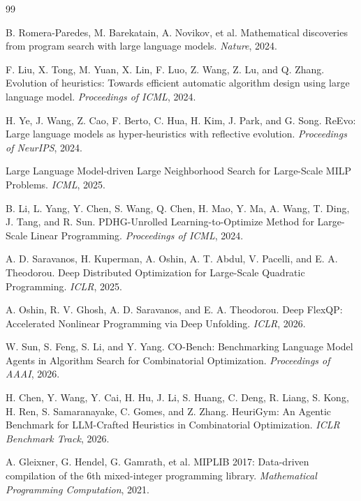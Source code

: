 \documentclass[UTF8,a4paper,12pt,fontset=fandol]{ctexart}
\begin{document}
\newpage
\begin{thebibliography}{99}

B. Romera-Paredes, M. Barekatain, A. Novikov, et al.
\newblock Mathematical discoveries from program search with large language models.
\newblock \emph{Nature}, 2024.

F. Liu, X. Tong, M. Yuan, X. Lin, F. Luo, Z. Wang, Z. Lu, and Q. Zhang.
\newblock Evolution of heuristics: Towards efficient automatic algorithm design using large language model.
\newblock \emph{Proceedings of ICML}, 2024.

H. Ye, J. Wang, Z. Cao, F. Berto, C. Hua, H. Kim, J. Park, and G. Song.
\newblock ReEvo: Large language models as hyper-heuristics with reflective evolution.
\newblock \emph{Proceedings of NeurIPS}, 2024.

Large Language Model-driven Large Neighborhood Search for Large-Scale MILP Problems.
\newblock \emph{ICML}, 2025.

B. Li, L. Yang, Y. Chen, S. Wang, Q. Chen, H. Mao, Y. Ma, A. Wang, T. Ding, J. Tang, and R. Sun.
\newblock PDHG-Unrolled Learning-to-Optimize Method for Large-Scale Linear Programming.
\newblock \emph{Proceedings of ICML}, 2024.

A. D. Saravanos, H. Kuperman, A. Oshin, A. T. Abdul, V. Pacelli, and E. A. Theodorou.
\newblock Deep Distributed Optimization for Large-Scale Quadratic Programming.
\newblock \emph{ICLR}, 2025.

A. Oshin, R. V. Ghosh, A. D. Saravanos, and E. A. Theodorou.
\newblock Deep FlexQP: Accelerated Nonlinear Programming via Deep Unfolding.
\newblock \emph{ICLR}, 2026.

W. Sun, S. Feng, S. Li, and Y. Yang.
\newblock CO-Bench: Benchmarking Language Model Agents in Algorithm Search for Combinatorial Optimization.
\newblock \emph{Proceedings of AAAI}, 2026.

H. Chen, Y. Wang, Y. Cai, H. Hu, J. Li, S. Huang, C. Deng, R. Liang, S. Kong, H. Ren, S. Samaranayake, C. Gomes, and Z. Zhang.
\newblock HeuriGym: An Agentic Benchmark for LLM-Crafted Heuristics in Combinatorial Optimization.
\newblock \emph{ICLR Benchmark Track}, 2026.

A. Gleixner, G. Hendel, G. Gamrath, et al.
\newblock MIPLIB 2017: Data-driven compilation of the 6th mixed-integer programming library.
\newblock \emph{Mathematical Programming Computation}, 2021.


\end{thebibliography}
\end{document}
